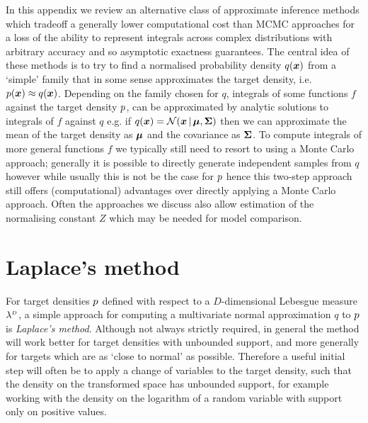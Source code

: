 In this appendix we review an alternative class of approximate inference methods which tradeoff a generally lower computational cost than \ac{MCMC} approaches for a loss of the ability to represent integrals across complex distributions with arbitrary accuracy and so asymptotic exactness guarantees. The central idea of these methods is to try to find a normalised probability density $q(\boldsymbol{x})$ from a `simple' family that in some sense approximates the target density, i.e. $p(\boldsymbol{x}) \approx q(\boldsymbol{x})$. Depending on the family chosen for $q$, integrals of some functions $f$ against the target density $p$, can be approximated by analytic solutions to integrals of $f$ against $q$ e.g. if $q(\vct{x}) = \nrm{\vct{x} \gvn \vct{\mu},\mtx{\Sigma}}$ then we can approximate the mean of the target density as $\boldsymbol{\mu}$ and the covariance as $\boldsymbol{\Sigma}$. To compute integrals of more general functions $f$ we typically still need to resort to using a Monte Carlo approach; generally it is possible to directly generate independent samples from $q$ however while usually this is not be the case for $p$ hence this two-step approach still offers (computational) advantages over directly applying a Monte Carlo approach. Often the approaches we discuss also allow estimation of the normalising constant $Z$ which may be needed for model comparison.

\section{Laplace's method}

For target densities $p$ defined with respect to a $D$-dimensional Lebesgue measure $\lebm{D}$, a simple approach for computing a multivariate normal approximation  $q$ to $p$ is \emph{Laplace's method}. Although not always strictly required, in general the method will work better for target densities with unbounded support, and more generally for targets which are as `close to normal' as possible. Therefore a useful initial step will often be to apply a change of variables to the target density, such that the density on the transformed space has unbounded support, for example working with the density on the logarithm of a random variable with support only on positive values.


